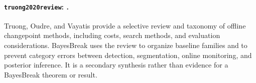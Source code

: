 
\paragraph{\texttt{truong2020review}: \citet{truong2020review}.}
Truong, Oudre, and Vayatis provide a selective review and taxonomy of offline changepoint methods, including costs, search methods, and evaluation considerations. BayesBreak uses the review to organize baseline families and to prevent category errors between detection, segmentation, online monitoring, and posterior inference. It is a secondary synthesis rather than evidence for a BayesBreak theorem or result.

